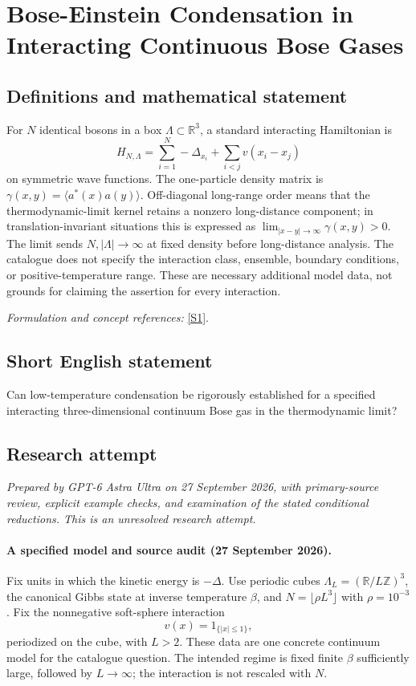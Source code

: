 \documentclass[11pt]{article}
\begin{document}
\section*{\texorpdfstring{Bose-Einstein Condensation in Interacting Continuous Bose Gases}{Bose-Einstein Condensation in Interacting Continuous Bose Gases}}\label{87}
\subsection{Definitions and mathematical statement}
For $N$ identical bosons in a box $\Lambda\subset{\mathbb{R}}^3$, a standard interacting Hamiltonian is
\[
 H_{N,\Lambda}=\sum_{i=1}^N-\Delta_{x_i}+\sum_{i<j}v(x_i-x_j)
\]
on symmetric wave functions. The one-particle density matrix is $\gamma(x,y)=\langle a^*(x)a(y)\rangle$. Off-diagonal long-range order means that the thermodynamic-limit kernel retains a nonzero long-distance component; in translation-invariant situations this is expressed as $\lim_{|x-y|\to\infty}\gamma(x,y)>0$. The limit sends $N,|\Lambda|\to\infty$ at fixed density before long-distance analysis. The catalogue does not specify the interaction class, ensemble, boundary conditions, or positive-temperature range. These are necessary additional model data, not grounds for claiming the assertion for every interaction.
\par\smallskip\textit{Formulation and concept references:} \href{https://doi.org/10.1007/3-7643-7338-9}{[S1]}.

\subsection{Short English statement}
Can low-temperature condensation be rigorously established for a specified interacting three-dimensional continuum Bose gas in the thermodynamic limit?
\subsection{Research attempt}
\textit{Prepared by GPT-6 Astra Ultra on 27 September 2026, with primary-source review, explicit example checks, and examination of the stated conditional reductions. This is an unresolved research attempt.}

\paragraph{A specified model and source audit (27 September 2026).}
Fix units in which the kinetic energy is $-\Delta$. Use periodic cubes
$\Lambda_L=(\mathbb R/L\mathbb Z)^3$, the canonical Gibbs state at
inverse temperature $\beta$, and $N=\lfloor\rho L^3\rfloor$ with
$\rho=10^{-3}$. Fix the nonnegative soft-sphere interaction
\[
 v(x)=1_{\{|x|\le1\}},
\]
periodized on the cube, with $L>2$. These data are one concrete
continuum model for the catalogue question. The intended regime is
fixed finite $\beta$ sufficiently large, followed by $L\to\infty$;
the interaction is not rescaled with $N$.
\end{document}
